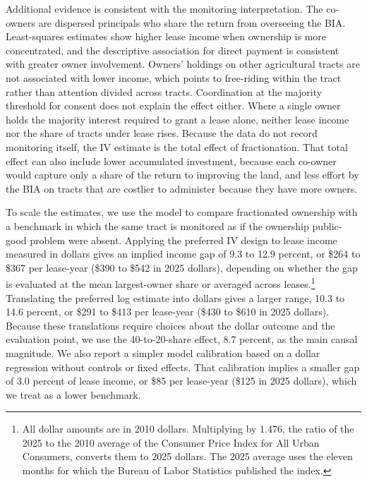 \documentclass[12pt]{article}
\begin{document}
Additional evidence is consistent with the monitoring interpretation. The co-owners are dispersed principals who share the return from overseeing the BIA. Least-squares estimates show higher lease income when ownership is more concentrated, and the descriptive association for direct payment is consistent with greater owner involvement. Owners' holdings on other agricultural tracts are not associated with lower income, which points to free-riding within the tract rather than attention divided across tracts. Coordination at the majority threshold for consent does not explain the effect either. Where a single owner holds the majority interest required to grant a lease alone, neither lease income nor the share of tracts under lease rises. Because the data do not record monitoring itself, the IV estimate is the total effect of fractionation. That total effect can also include lower accumulated investment, because each co-owner would capture only a share of the return to improving the land, and less effort by the BIA on tracts that are costlier to administer because they have more owners.

To scale the estimates, we use the model to compare fractionated ownership with a benchmark in which the same tract is monitored as if the ownership public-good problem were absent. Applying the preferred IV design to lease income measured in dollars gives an implied income gap of 9.3 to 12.9 percent, or \$264 to \$367 per lease-year (\$390 to \$542 in 2025 dollars), depending on whether the gap is evaluated at the mean largest-owner share or averaged across leases.\footnote{All dollar amounts are in 2010 dollars. Multiplying by 1.476, the ratio of the 2025 to the 2010 average of the Consumer Price Index for All Urban Consumers, converts them to 2025 dollars. The 2025 average uses the eleven months for which the Bureau of Labor Statistics published the index.} Translating the preferred log estimate into dollars gives a larger range, 10.3 to 14.6 percent, or \$291 to \$413 per lease-year (\$430 to \$610 in 2025 dollars). Because these translations require choices about the dollar outcome and the evaluation point, we use the 40-to-20-share effect, 8.7 percent, as the main causal magnitude. We also report a simpler model calibration based on a dollar regression without controls or fixed effects. That calibration implies a smaller gap of 3.0 percent of lease income, or \$85 per lease-year (\$125 in 2025 dollars), which we treat as a lower benchmark.
\end{document}
